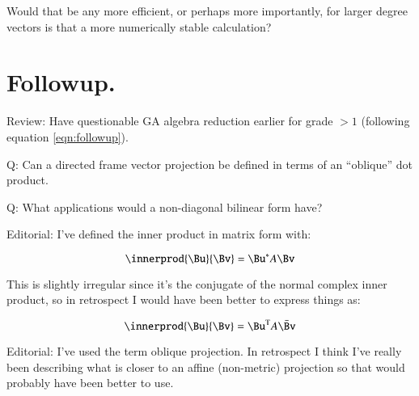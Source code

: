 \documentclass{article}      %
\newcommand{\T}[0]{\text{T}}
\begin{document}
Would that be any more efficient, or perhaps more importantly, for larger degree vectors is that a more numerically stable calculation?

\section{ Followup. } 

Review: Have questionable GA algebra reduction earlier for grade $>1$ (following equation \ref{eqn:followup}).

Q: Can a directed frame vector projection be defined in terms of an ``oblique'' dot product.

Q: What applications would a non-diagonal bilinear form have?

Editorial: I've defined the inner product in matrix form with:

\[
\innerprod{\Bu}{\Bv} = \Bu^* A \Bv
\]

This is slightly irregular since it's the conjugate of the normal complex
inner product, so in retrospect I would have been better to express things as:

\[
\innerprod{\Bu}{\Bv} = \Bu^\T A \bar{\Bv}
\]

Editorial: I've used the term oblique projection.  In retrospect I think I've really been describing what is closer to an affine (non-metric) projection so that would probably have been better to use.

\end{document}
